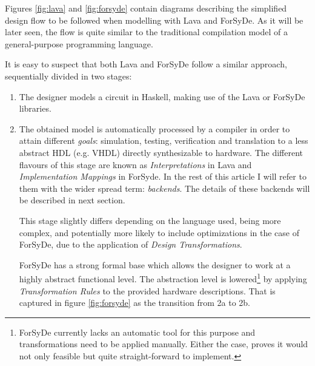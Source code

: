 \documentclass[a4paper,twoside,11pt]{article}
\begin{document}
\begin{body}
Figures \ref{fig:lava} and \ref{fig:forsyde} contain diagrams
describing the simplified design flow to be followed when modelling with
Lava and ForSyDe.  As it will be later seen, the flow is quite
similar to the traditional compilation model of a
general-purpose programming language.

It is easy to suspect that both Lava and ForSyDe follow a similar
approach, sequentially divided in two stages:

\begin{enumerate}[1)]
  \item The designer models a circuit in Haskell, making use
    of the Lava or ForSyDe libraries.
  \item The obtained model is automatically processed by a compiler in
    order to attain different \textit{goals}: simulation, testing,
    verification and translation to a less abstract HDL (e.g. VHDL)
    directly synthesizable to hardware. The different flavours of this
    stage are known as \textit{Interpretations} in Lava and
    \textit{Implementation Mappings} in ForSyde. In the rest of this
    article I will refer to them with the wider spread term:
    \textit{backends}.  The details of these backends will be
    described in next section.

    This stage slightly differs depending on the language used, being more
    complex, and potentially more likely to include optimizations in
    the case of ForSyDe, due to the application of \textit{Design
      Transformations}.
    
    ForSyDe has a strong formal base which allows the designer to work
    at a highly abstract functional level. The abstraction level is
    lowered\footnote{ForSyDe currently lacks an automatic tool
      for this purpose and transformations need to be applied
      manually. Either the case, \cite{forsyde:thesis} proves it would not
      only feasible but quite straight-forward to implement.} by
    applying \textit{Transformation Rules} to the provided hardware
    descriptions. That is captured in figure \ref{fig:forsyde} as the
    transition from 2a to 2b.


\end{enumerate}
\end{body}
\end{document}

